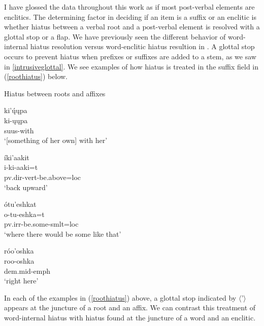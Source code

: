 I have glossed the data throughout this work as if most post-verbal elements are enclitics. The determining factor in deciding if an item is a suffix or an enclitic is whether hiatus between a verbal root and a post-verbal element is resolved with a glottal stop or a flap. We have previously seen the different behavior of word-internal hiatus resolution versus word-enclitic hiatus resultion in . A glottal stop occurs to prevent hiatus when prefixes or suffixes are added to a stem, as we saw in \ref{intrusiveglottal}. We see examples of how hiatus is treated in the suffix field in (\ref{roothiatus}) below.

\begin{exe}
\item\label{roothiatus} Hiatus between roots and affixes

	\begin{xlist}
	
	\item \glll ki'ų́ųpa\\
		ki-ųųpa\\
		suus-\textnormal{with}\\
		\glt `[something of her own] with her' \citep[219]{hollow1973a}
	
	\item \glll íki'aakit\\
	i-ki-aaki=t\\
	pv.dir-vert-\textnormal{be.above}=loc\\
	\glt `back upward' \citep[153]{hollow1973a}
	
	\item \glll ótu'eshkat\\
	o-tu-eshka=t\\
	pv.irr-\textnormal{be.some}-smlt=loc\\
	\glt `where there would be some like that' \citep[122]{hollow1973a}
	
	\item \glll róo'oshka\\
	roo-oshka\\
	dem.mid-emph\\
	\glt `right here' \citep[183]{hollow1973a}
		
	\end{xlist}

\end{exe}

In each of the examples in (\ref{roothiatus}) above, a glottal stop indicated by $\langle$'$\rangle$ appears at the juncture of a root and an affix. We can contrast this treatment of word-internal hiatus with hiatus found at the juncture of a word and an enclitic.

